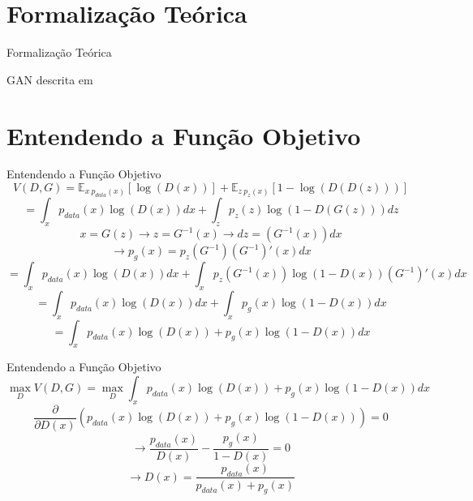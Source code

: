 \documentclass[10pt]{beamer}
\begin{document}
\section[Teoria]{Formalização Teórica}
\begin{frame}[fragile]{Formalização Teórica}

  \footnotesize
  \begin{algorithm}[H]
  \SetAlgoLined
   \caption{GAN descrita em \citet{goodfellow2014}}
  \end{algorithm}

\end{frame}


\section [Teoria]{Entendendo a Função Objetivo}
\begin{frame}[fragile]{Entendendo a Função Objetivo}
  $$V(D,G) = \mathbb{E}_{x~p_{data}(x)}\left[\log{(D(x))}\right]+\mathbb{E}_{z~p_z(x)}\left[1-\log{(D(D(z)))}\right] $$
  \pause
  $$= \int_x p_{data}(x)\log{(D(x))}dx + \int_z p_z(z)\log{(1-D(G(z)))}dz $$
  \pause
  $$x = G(z) \rightarrow z = G^{-1}(x) \rightarrow dz = (G^{-1}(x))dx $$
  $$\rightarrow p_g(x) = p_z(G^{-1})(G^{-1})'(x)dx $$
  \pause
  $$= \int_x p_{data}(x)\log{(D(x))}dx + \int_x p_z(G^{-1}(x))\log{(1-D(x))}(G^{-1})'(x)dx $$
  \pause
  $$= \int_x p_{data}(x)\log{(D(x))}dx + \int_x p_g(x)\log{(1-D(x))}dx $$
  \pause
  $$= \int_x p_{data}(x)\log{(D(x))} + p_g(x)\log{(1-D(x))}dx $$
\end{frame}

\begin{frame}[fragile]{Entendendo a Função Objetivo}
 $$\max_{D} V(D,G) = \max_{D}\int_x p_{data}(x)\log{(D(x))} + p_g(x)\log{(1-D(x))}dx $$
 \pause
 $$\frac{\partial}{\partial D(x)} \left(p_{data}(x)\log{(D(x))} + p_g(x)\log{(1-D(x))}\right) = 0 $$
 \pause
 $$\rightarrow \dfrac{p_{data}(x)}{D(x)} - \dfrac{p_g(x)}{1 - D(x)} = 0 $$
 $$\rightarrow D(x) = \dfrac{p_{data}(x)}{p_{data}(x)+p_g(x)} $$
\end{frame}
\end{document}
